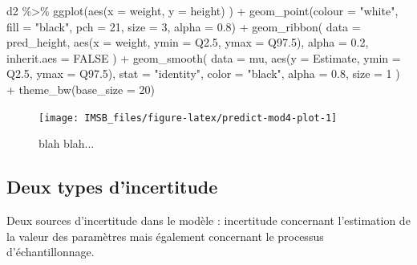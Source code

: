 \documentclass[
  a4paper,11pt,twoside,onecolumn,openright,final,oldfontcommands]{memoir}
\newenvironment{Shaded}{\begin{snugshade}}{\end{snugshade}}
\newcommand{\AttributeTok}[1]{\textcolor[rgb]{0.77,0.63,0.00}{#1}}
\newcommand{\ConstantTok}[1]{\textcolor[rgb]{0.00,0.00,0.00}{#1}}
\newcommand{\DecValTok}[1]{\textcolor[rgb]{0.00,0.00,0.81}{#1}}
\newcommand{\FloatTok}[1]{\textcolor[rgb]{0.00,0.00,0.81}{#1}}
\newcommand{\FunctionTok}[1]{\textcolor[rgb]{0.00,0.00,0.00}{#1}}
\newcommand{\NormalTok}[1]{#1}
\newcommand{\SpecialCharTok}[1]{\textcolor[rgb]{0.00,0.00,0.00}{#1}}
\newcommand{\StringTok}[1]{\textcolor[rgb]{0.31,0.60,0.02}{#1}}
\theoremstyle{definition}
\theoremstyle{definition}
\theoremstyle{definition}
\theoremstyle{definition}
\theoremstyle{remark}
\begin{document}
\begin{Shaded}
\begin{Highlighting}[]
\NormalTok{d2 }\SpecialCharTok{\%\textgreater{}\%}
  \FunctionTok{ggplot}\NormalTok{(}\FunctionTok{aes}\NormalTok{(}\AttributeTok{x =}\NormalTok{ weight, }\AttributeTok{y =}\NormalTok{ height) ) }\SpecialCharTok{+}
  \FunctionTok{geom\_point}\NormalTok{(}\AttributeTok{colour =} \StringTok{"white"}\NormalTok{, }\AttributeTok{fill =} \StringTok{"black"}\NormalTok{, }\AttributeTok{pch =} \DecValTok{21}\NormalTok{, }\AttributeTok{size =} \DecValTok{3}\NormalTok{, }\AttributeTok{alpha =} \FloatTok{0.8}\NormalTok{) }\SpecialCharTok{+}
  \FunctionTok{geom\_ribbon}\NormalTok{(}
    \AttributeTok{data =}\NormalTok{ pred\_height, }\FunctionTok{aes}\NormalTok{(}\AttributeTok{x =}\NormalTok{ weight, }\AttributeTok{ymin =}\NormalTok{ Q2}\FloatTok{.5}\NormalTok{, }\AttributeTok{ymax =}\NormalTok{ Q97}\FloatTok{.5}\NormalTok{),}
    \AttributeTok{alpha =} \FloatTok{0.2}\NormalTok{, }\AttributeTok{inherit.aes =} \ConstantTok{FALSE}
\NormalTok{    ) }\SpecialCharTok{+}
  \FunctionTok{geom\_smooth}\NormalTok{(}
    \AttributeTok{data =}\NormalTok{ mu, }\FunctionTok{aes}\NormalTok{(}\AttributeTok{y =}\NormalTok{ Estimate, }\AttributeTok{ymin =}\NormalTok{ Q2}\FloatTok{.5}\NormalTok{, }\AttributeTok{ymax =}\NormalTok{ Q97}\FloatTok{.5}\NormalTok{),}
    \AttributeTok{stat =} \StringTok{"identity"}\NormalTok{, }\AttributeTok{color =} \StringTok{"black"}\NormalTok{, }\AttributeTok{alpha =} \FloatTok{0.8}\NormalTok{, }\AttributeTok{size =} \DecValTok{1}
\NormalTok{    ) }\SpecialCharTok{+}
  \FunctionTok{theme\_bw}\NormalTok{(}\AttributeTok{base\_size =} \DecValTok{20}\NormalTok{)}
\end{Highlighting}
\end{Shaded}

\begin{figure}[!htb]

{\centering \texttt{[image: IMSB\_files/figure-latex/predict-mod4-plot-1]} 

}

\caption{blah blah...}\label{fig:predict-mod4-plot}
\end{figure}

\hypertarget{deux-types-dincertitude}{%
\subsection{Deux types d'incertitude}\label{deux-types-dincertitude}}

Deux sources d'incertitude dans le modèle : incertitude concernant l'estimation de la valeur des paramètres mais également concernant le processus d'échantillonnage.
\end{document}
